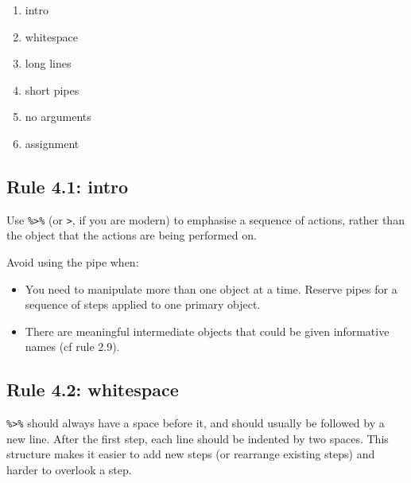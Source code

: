 \documentclass[
  letterpaper,
  DIV=11,
  numbers=noendperiod]{scrreprt}
\providecommand{\tightlist}{%
  \setlength{\itemsep}{0pt}\setlength{\parskip}{0pt}}\usepackage{longtable,booktabs,array}
\begin{document}
\begin{enumerate}
\def\labelenumi{\arabic{enumi}.}
\tightlist
\item
  intro
\item
  whitespace
\item
  long lines
\item
  short pipes
\item
  no arguments
\item
  assignment
\end{enumerate}

\subsection{Rule 4.1: intro}\label{rule-4.1-intro}

Use \texttt{\%\textgreater{}\%} (or \texttt{\textbar{}\textgreater{}},
if you are modern) to emphasise a sequence of actions, rather than the
object that the actions are being performed on.

Avoid using the pipe when:

\begin{itemize}
\item
  You need to manipulate more than one object at a time. Reserve pipes
  for a sequence of steps applied to one primary object.
\item
  There are meaningful intermediate objects that could be given
  informative names (cf rule 2.9).
\end{itemize}

\subsection{Rule 4.2: whitespace}\label{rule-4.2-whitespace}

\texttt{\%\textgreater{}\%} should always have a space before it, and
should usually be followed by a new line. After the first step, each
line should be indented by two spaces. This structure makes it easier to
add new steps (or rearrange existing steps) and harder to overlook a
step.
\end{document}

